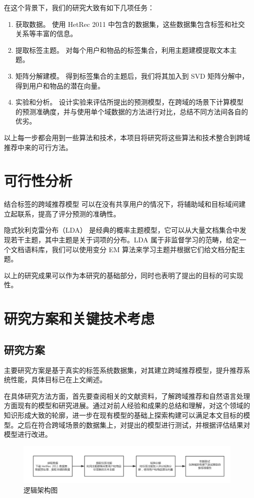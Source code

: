 在这个背景下，我们的研究大致有如下几项任务：
\begin{enumerate}[itemindent=1em]
\item {获取数据。} 使用 HetRec 2011 中包含的数据集，这些数据集包含标签和社交关系等丰富的信息。
\item {提取标签主题。} 对每个用户和物品的标签集合，利用主题建模提取文本主题。
\item {矩阵分解建模。} 得到标签集合的主题后，我们将其加入到 SVD 矩阵分解中，得到用户和物品的潜在向量。
\item {实验和分析。} 设计实验来评估所提出的预测模型，在跨域的场景下计算模型的预测准确度，并与使用单个域数据的方法进行对比，总结不同方法间各自的优劣。
\end{enumerate}
以上每一步都会用到一些算法和技术，本项目将研究将这些算法和技术整合到跨域推荐中来的可行方法。

\chapter{可行性分析}
结合标签的跨域推荐模型\cite{shi2011tags} 可以在没有共享用户的情况下，将辅助域和目标域间建立起联系，提高了评分预测的准确性。

隐式狄利克雷分布（LDA）\cite{Blei2003Latent} 是经典的概率主题模型，它可以从大量文档集合中发现若干主题，其中主题是关于词项的分布。LDA 属于非监督学习的范畴，给定一个文档语料库，我们可以使用变分 EM 算法来学习主题并根据它们给文档分配主题。

以上的研究成果可以作为本研究的基础部分，同时也表明了提出的目标的可实现性。

\chapter{研究方案和关键技术考虑}
\section{研究方案}
主要研究方案是基于真实的标签系统数据集，对其建立跨域推荐模型，提升推荐系统性能，具体目标已在上文阐述。

在具体研究方法方面，首先要查阅相关的文献资料，了解跨域推荐和自然语言处理方面现有的模型和研究进展。通过对前人经验和成果的总结和理解，对这个领域的知识形成大致的轮廓，进一步在现有模型的基础上探索构建可以满足本文目标的模型。之后在符合跨域场景的数据集上，对提出的模型进行测试，并根据评估结果对模型进行改进。
\begin{figure}[h]
\includegraphics[width=\linewidth]{images/毕设-开题-逻辑架构图.png}
\caption{逻辑架构图}
\label{fig:fig1}
\end{figure}

